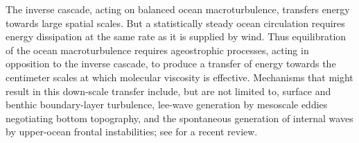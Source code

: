 \documentclass{jfm}
\newcommand{\macrot}{macroturbulence}
\begin{document}
The  inverse cascade, acting on balanced ocean \macrot{},  transfers energy towards
large spatial scales. But a statistically steady ocean circulation requires
energy dissipation at the same rate as it is supplied  by wind.  Thus equilibration of
the  ocean \macrot{}  requires ageostrophic processes, acting in opposition to the
inverse cascade, to produce   a transfer of energy  towards the centimeter scales
at which molecular viscosity is effective.  Mechanisms that might result in this
down-scale transfer   include, but are not limited to, surface and
benthic boundary-layer turbulence, lee-wave generation by mesoscale eddies negotiating
bottom topography, and the spontaneous generation of internal waves by upper-ocean
frontal instabilities; see  \citet{nagai_etal2015} for a recent
review.
\end{document}

